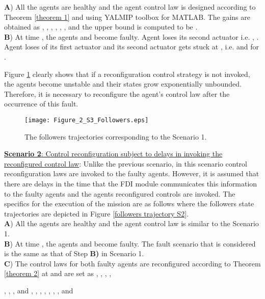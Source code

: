 \documentclass[12pt,draftcls,onecolumn]{IEEEtran}
\begin{document}
\textbf{A}) All the agents are healthy and the agent control law is designed according to Theorem \ref{theorem 1} and using YALMIP toolbox \cite{Yalmip} for MATLAB. The gains are obtained as , 
, 
 , 
   ,  
  , 
   ,
      and  the   upper bound is computed to be  .
 \\
\textbf{B}) At time , the agents  and  become faulty. Agent  loses its second actuator i.e. , . Agent  loses  of its first actuator and its second actuator gets stuck at , i.e.  and  for .\par
 Figure \ref{followers trajectory S1} clearly shows that  if a reconfiguration control strategy is not invoked, the agents become unstable and their states grow exponentially unbounded. Therefore, it is necessary to reconfigure the agent's control law after the occurrence of this fault. \par 
      \begin{figure}[thpb]
      \centering
                  \texttt{[image: Figure\_2\_S3\_Followers.eps]}
      \caption{The  followers trajectories corresponding to the Scenario 1.}     
      \label{followers trajectory S1}
   \end{figure} 
\underline{\textbf{ Scenario 2}: Control reconfiguration subject to delays in invoking the reconfigured control law}: Unlike the previous scenario, in this scenario  control reconfiguration laws are invoked to the faulty agents. However, 
   it is assumed that there are delays in the time that the FDI module communicates this information to the faulty agents and the agents reconfigured controls are invoked.  
  The specifics for the execution of the mission  are as follows where the followers state trajectories are depicted in Figure \ref{followers trajectory S2}. \\
\textbf{A}) All the agents are healthy and the agent control law is similar to the Scenario 1.  \\
\textbf{B}) At time , the agents  and  become faulty. The fault scenario that is considered is the same as that of  Step \textbf{B)} in Scenario 1. \\
\textbf{C}) The control laws for both faulty agents are reconfigured according to  Theorem \ref{theorem 2} at  and are set as 
, 
, , 
   ,  
   
, 
    , ,  and 
   , 
   , 
    , 
     , 
  , 
    , ,  and 
 
\end{document}
